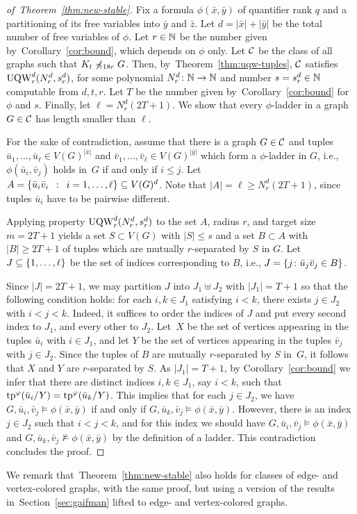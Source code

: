 \begin{proof}[of~Theorem~\ref{thm:new-stable}]
Fix a formula $\phi(\bar x,\bar y)$ of quantifier rank $q$ and
a partitioning of its 
free variables into  $\bar y$ and $\bar z$.
Let $d=|\bar x|+|\bar y|$ be the total number of free variables of $\phi$.
Let $r\in \N$ be the number given by~Corollary~\ref{cor:bound},
which depends on $\phi$ only.
Let $\cal C$ be the class of all graphs 
such that  $K_t\not\minor_{18r} G$.
Then, by~Theorem~\ref{thm:uqw-tuples}, 
$\cal C$ satisfies $\uqw^d_{r}(N^d_{r},s^d_r)$,
for some  polynomial  $N^d_r\from\N\to\N$ and number $s=s^d_r\in \N$ computable from $d,t,r$.
Let $T$ be the number given by~Corollary~\ref{cor:bound} for $\phi$ and $s$.
 Finally, let 
$\ell=N^d_r(2T+1)$.
We show that 
every $\phi$-ladder in a graph $G\in\cal C$ has length smaller than $\ell$.


For the sake of contradiction, assume that there is a graph $G\in\cal C$
and tuples $\bar u_1,\ldots,\bar u_\ell\in V(G)^{|\bar x|}$ and $ \bar v_1,\ldots, \bar v_\ell\in V(G)^{|\bar y|}$
which form a $\phi$-ladder in $G$, i.e., 
$\phi(\bar u_i,\bar v_j)$ holds in~$G$ if and only if $i\le j$.
	Let $A=\setof{ \bar u_i \bar v_i}{i=1,\ldots,\ell}\subset V(G)^d$. Note that $|A|=\ell\ge N^d_r(2T+1)$, since tuples $\bar u_i$ have to be pairwise different.
  
Applying property  $\uqw^d_r(N^d_r,s^d_r)$ to the set $A$, radius $r$, and target size $m=2T+1$
		 yields a set $S\subset V(G)$ with $|S|\le s$
	and a set $B\subset A$ with $|B|\geq 2T+1$ 
  of tuples which are  mutually $r$-separated by $S$  in $G$.
  Let $J\subseteq \set{1,\ldots,\ell}$
  be the set of indices corresponding to $B$,
  i.e., $J=\set{j\colon\bar u_j\bar v_j\in B}$.
  
  Since $|J|=2T+1$, we may partition $J$ into $J_1\uplus J_2$ with $|J_1|=T+1$ so that the following condition holds:
  for each $i,k\in J_1$ satisfying $i<k$, there exists $j\in J_2$ with $i<j<k$. Indeed, it suffices to order the indices of $J$ and put every second index to $J_1$, and every other to $J_2$.
  Let~$X$ be the set of vertices appearing in the tuples $\bar u_i$ with $i\in J_1$, and let $Y$ be the set of vertices appearing in the tuples $\bar v_j$ with $j\in J_2$.
  Since the tuples of $B$ are mutually $r$-separated by $S$ in~$G$, it follows that $X$ and $Y$ are $r$-separated by $S$.
  As $|J_1|=T+1$, by Corollary~\ref{cor:bound} we infer that there are distinct indices $i,k\in J_1$, say $i<k$, such that $\tp^\phi(\bar u_i/Y)=
    \tp^\phi(\bar u_{k}/Y)$. This implies that for each $j\in J_2$, we have $G,\bar u_i,\bar v_j\models \phi(\bar x,\bar y)$ if and only if $G,\bar u_{k},\bar v_j\models \phi(\bar x,\bar y)$.
    However, there is an index $j\in J_2$ such that $i<j<k$, and for this index we should have $G,\bar u_i,\bar v_j\models \phi(\bar x,\bar y)$ and $G,\bar u_{k},\bar v_j\not\models \phi(\bar x,\bar y)$
    by the definition of a ladder. This contradiction concludes the proof.
\end{proof}

We remark that~Theorem~\ref{thm:new-stable} also holds for classes of edge- and vertex-colored graphs, with the same proof, but using 
a version of the results in~Section~\ref{sec:gaifman} lifted to edge- and vertex-colored graphs.
